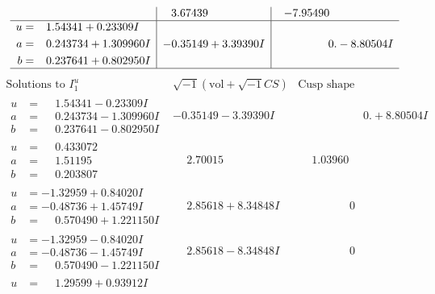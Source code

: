 \documentclass[1p]{elsarticle_modified}
\theoremstyle{definition}
\newcommand{\I}{\sqrt{-1}}
\begin{document}
$$\begin{array}{c|c|c}
 & \phantom{-}3.67439\phantom{ +0.000000I} & -7.95490\phantom{ +0.000000I} \\ \hline\begin{aligned}
u &= \phantom{-}1.54341 + 0.23309 I \\
a &= \phantom{-}0.243734 + 1.309960 I \\
b &= \phantom{-}0.237641 + 0.802950 I\end{aligned}
 & -0.35149 + 3.39390 I & \phantom{-0.000000 } 0. - 8.80504 I\\
 \hline 
 \end{array}$$\newpage$$\begin{array}{c|c|c}  
\text{Solutions to }I^u_{1}& \I (\text{vol} + \sqrt{-1}CS) & \text{Cusp shape}\\
 \hline 
\begin{aligned}
u &= \phantom{-}1.54341 - 0.23309 I \\
a &= \phantom{-}0.243734 - 1.309960 I \\
b &= \phantom{-}0.237641 - 0.802950 I\end{aligned}
 & -0.35149 - 3.39390 I & \phantom{-0.000000 -}0. + 8.80504 I \\ \hline\begin{aligned}
u &= \phantom{-}0.433072\phantom{ +0.000000I} \\
a &= \phantom{-}1.51195\phantom{ +0.000000I} \\
b &= \phantom{-}0.203807\phantom{ +0.000000I}\end{aligned}
 & \phantom{-}2.70015\phantom{ +0.000000I} & \phantom{-}1.03960\phantom{ +0.000000I} \\ \hline\begin{aligned}
u &= -1.32959 + 0.84020 I \\
a &= -0.48736 + 1.45749 I \\
b &= \phantom{-}0.570490 + 1.221150 I\end{aligned}
 & \phantom{-}2.85618 + 8.34848 I & \phantom{-0.000000 } 0 \\ \hline\begin{aligned}
u &= -1.32959 - 0.84020 I \\
a &= -0.48736 - 1.45749 I \\
b &= \phantom{-}0.570490 - 1.221150 I\end{aligned}
 & \phantom{-}2.85618 - 8.34848 I & \phantom{-0.000000 } 0 \\ \hline\begin{aligned}
u &= \phantom{-}1.29599 + 0.93912 I \\

\end{aligned}
\end{array}$$
\end{document}
